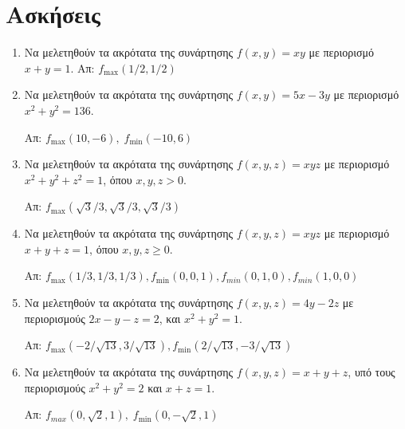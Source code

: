 


\geometry{top=2cm}
\pagestyle{askhseis}

\renewcommand{\vec}{\mathbf}



\begin{center}
  \minibox{\large \bfseries \textcolor{Col1}{Ασκήσεις στα Ακρότατα Με Περιορισμό}}
\end{center}

\section*{Ασκήσεις}

\begin{enumerate}
  \item Να μελετηθούν τα ακρότατα της συνάρτησης $ f(x,y) = xy $ με περιορισμό 
    $ x+y=1 $. \hfill Απ: $ f_{\max}(1/2,1/2) $ 
  \item Να μελετηθούν τα ακρότατα της συνάρτησης $ f(x,y) = 5x-3y $ με περιορισμό 
    $x^{2}+y^{2}=136$. 

    \hfill Απ: $ f_{\max}(10,-6), \; f_{\min}(-10,6) $ 

  \item Να μελετηθούν τα ακρότατα της συνάρτησης $ f(x,y,z) = xyz $ με περιορισμό 
    $x^{2}+y^{2}+z^{2}=1 $, όπου $ x,y,z>0 $. 

    \hfill Απ: $ f_{\max}(\sqrt{3} /3,\sqrt{3} /3,\sqrt{3} /3) $ 

  \item Να μελετηθούν τα ακρότατα της συνάρτησης $ f(x,y,z) = xyz $ με περιορισμό 
    $x+y+z=1 $, όπου $ x,y,z \geq 0 $. 

    \hfill Απ: $ f_{\max}(1/3,1/3,1/3), f_{\min}(0,0,1), f_{min}(0,1,0), 
    f_{min}(1,0,0) $ 

  \item Να μελετηθούν τα ακρότατα της συνάρτησης $ f(x,y,z) = 4y-2z $ με περιορισμούς 
    $2x-y-z=2$, και $x^{2}+y^{2}=1$. 

    \hfill Απ: $ f_{\max}(-2/ \sqrt{13} , 3 / \sqrt{13}), 
    f_{\min}(2 / \sqrt{13}, - 3 / \sqrt{13})$ 

  \item Να μελετηθούν τα ακρότατα της συνάρτησης $ f(x,y,z) = x+y+z $, υπό 
    τους περιορισμούς $ x^{2}+y^{2}=2 $ και $ x+z=1 $.

\hfill Απ: $ f_{max}(0, \sqrt{2} , 1), \; f_{\min}(0, - \sqrt{2} , 1) $ 
\end{enumerate}


